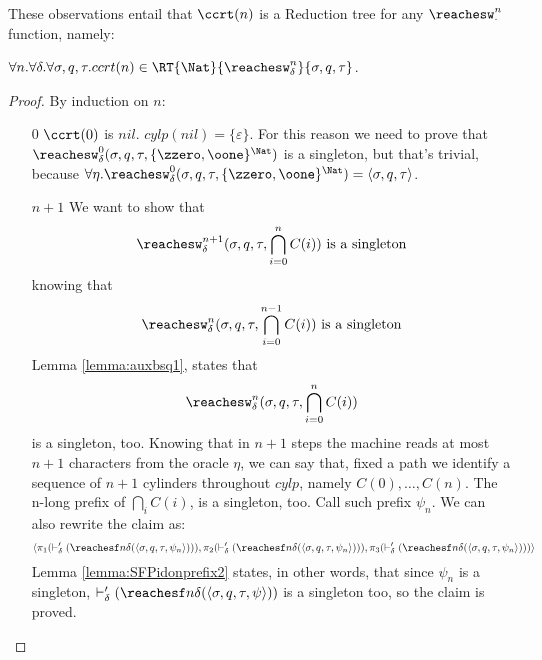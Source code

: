 \begin{conditional}{\notappendix}
    These observations entail that $\ccrt(n)$ is a Reduction tree for any
    $\reachesw^n_\cdot$ function, namely:

    \begin{lemma}
      $\forall n.\forall \delta.\forall \sigma, q, \tau.ccrt(n) \in \RT{\Nat}
      { \reachesw^n_\delta}{\sigma, q, \tau}$.
    \end{lemma}
    \begin{proof}
      By induction on $n$:
      \begin{itemize}
        \item[$0$] $\ccrt(0)$ is $\mathit{nil}$.
        $\mathit{cylp}(\mathit{nil})=\{\varepsilon\}$.
        For this reason we need to prove that $\reachesw^0_\delta(
        \sigma, q, \tau, \{\zzero,\oone\}^\Nat)$ is a singleton,
        but that's trivial, because $\forall \eta. \reachesw^0_\delta(
        \sigma, q, \tau, \{\zzero,\oone\}^\Nat)=\langle
        \sigma, q, \tau\rangle$.
        \item[$n+1$]
        We want to show that
        \[
        \reachesw^{n+1}_\delta(\sigma,q, \tau,\bigcap_{i=0}^n C(i)) \text{ is a singleton}
        \]
        knowing that
        \[
        \reachesw^{n}_\delta(\sigma,q, \tau,\bigcap_{i=0}^{n-1} C(i)) \text{ is a singleton}
        \]
        Lemma \ref{lemma:auxbsq1}, states that
        \[
        \reachesw^{n}_\delta(\sigma,q, \tau,\bigcap_{i=0}^{n} C(i))
        \]
        is a singleton, too. Knowing that in $n+1$ steps the machine reads at most
        $n+1$ characters from the oracle $\eta$, we can say that, fixed a path
        we identify a sequence of $n+1$ cylinders throughout $\mathit{cylp}$,
        namely
        $C(0), \ldots, C(n)$. The n-long prefix of $\bigcap_i C(i)$,
        is a singleton, too. Call such prefix $\psi_n$.
        We can also rewrite the claim as:
        \[
        \langle
        \pi_1(\vdash_\delta'(\reachesf n \delta(\langle \sigma, q, \tau, \psi_n\rangle))),
        \pi_2(\vdash_\delta'(\reachesf n \delta(\langle \sigma, q, \tau, \psi_n\rangle))),
        \pi_3(\vdash_\delta'(\reachesf n \delta(\langle \sigma, q, \tau, \psi_n\rangle)))
        \rangle
        \]
        Lemma \ref{lemma:SFPidonprefix2} states, in other words, that since
        $\psi_n$ is a singleton,
        $\vdash_\delta'(\reachesf n \delta(\langle \sigma, q, \tau, \psi\rangle))$
        is a singleton too, so the claim is proved.
      \end{itemize}
    \end{proof}


\end{conditional}
